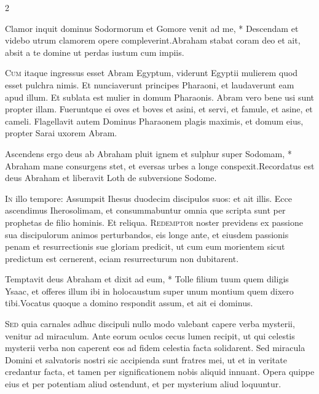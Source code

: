\begin{multicols*}{2}
\begin{responsory}
{Clamor inquit dominus Sodormorum et Gomore venit ad me, * Descendam et videbo utrum clamorem opere compleverint.}{Abraham stabat coram deo et ait, absit a te domine ut perdas iustum cum impiis.}
\end{responsory}%
\lettrine[lines=2]{\zallmancaps \color{Blue} C}{um} itaque ingressus esset Abram Egyptum, viderunt Egyptii mulierem quod esset pulchra nimis. Et nunciaverunt principes Pharaoni, et laudaverunt eam apud illum. Et sublata est mulier in domum Pharaonis. Abram vero bene usi sunt propter illam. Fueruntque ei oves et boves et asini, et servi, et famule, et asine, et cameli. Flagellavit autem Dominus Pharaonem plagis maximis, et domum eius, propter Sarai uxorem Abram.
\begin{responsory-doxology}
{Ascendens ergo deus ab Abraham pluit ignem et sulphur super Sodomam, * Abraham mane consurgens stet, et eversas urbes a longe conspexit.}{Recordatus est deus Abraham et liberavit Loth de subversione Sodome.}
\end{responsory-doxology}%
\lettrine[lines=2]{\zallmancaps \color{Red} I}{n} illo tempore: Assumpsit Ihesus duodecim discipulos suos: et ait illis. Ecce ascendimus Iherosolimam, et consummabuntur omnia que scripta sunt per prophetas de filio hominis. Et reliqua.
\lettrine[lines=2]{\zallmancaps \color{Blue} R}{edemptor} noster previdens ex passione sua discipulorum animos perturbandos, eis longe ante, et eiusdem passionis penam et resurrectionis sue gloriam predicit, ut cum eum morientem sicut predictum est cernerent, eciam resurrecturum non dubitarent.
\begin{responsory}
{Temptavit deus Abraham et dixit ad eum, * Tolle filium tuum quem diligis Ysaac, et offeres illum ibi in holocaustum super unum montium quem dixero tibi.}{Vocatus quoque a domino respondit assum, et ait ei dominus.}
\end{responsory}%
\lettrine[lines=2]{\zallmancaps \color{Red} S}{ed} quia carnales adhuc discipuli nullo modo valebant capere verba mysterii, venitur ad miraculum. Ante eorum oculos cecus lumen recipit, ut qui celestis mysterii verba non caperent eos ad fidem celestia facta solidarent. Sed miracula Domini et salvatoris nostri sic accipienda sunt fratres mei, ut et in veritate credantur facta, et tamen per significationem nobis aliquid innuant. Opera quippe eius et per potentiam aliud ostendunt, et per mysterium aliud loquuntur.

\end{multicols*}

